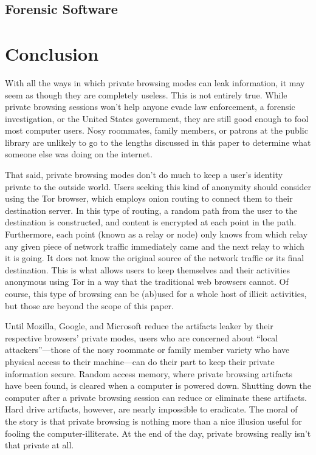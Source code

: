 \documentclass[pdftex,letterpaper,titlepage,12pt]{article}
\begin{document}
    \subsection{Forensic Software}
    

  \section{Conclusion}
  With all the ways in which private browsing modes can leak information, it
  may seem as though they are completely useless. This is not entirely true.
  While private browsing sessions won't help anyone evade law enforcement, a
  forensic investigation, or the United States government, they are still good
  enough to fool most computer users. Nosy roommates, family members, or
  patrons at the public library are unlikely to go to the lengths discussed in
  this paper to determine what someone else was doing on the internet.

  That said, private browsing modes don't do much to keep a user's identity
  private to the outside world. Users seeking this kind of anonymity should 
  consider using the Tor browser, which employs onion routing to connect them 
  to their destination server. In this type of routing, a random path from the 
  user to the destination is constructed, and content is encrypted at each 
  point in the path. Furthermore, each point (known as a relay or node) only 
  knows from which relay any given piece of network traffic immediately came 
  and the next relay to which it is going. It does not know the original source
  of the network traffic or its final destination. This is what allows users to
  keep themselves and their activities anonymous using Tor in a way that the 
  traditional web browsers cannot.\cite{tor13} Of course, this type of browsing
  can be (ab)used for a whole host of illicit activities, but those are beyond
  the scope of this paper.

  Until Mozilla, Google, and Microsoft reduce the artifacts leaker by their
  respective browsers' private modes, users who are concerned about ``local 
  attackers''---those of the nosy roommate or family member variety who have 
  physical access to their machine---can do their part to keep their private
  information secure. Random access memory, where private browsing artifacts
  have been found, is cleared when a computer is powered down. Shutting down
  the computer after a private browsing session can reduce or eliminate these
  artifacts. Hard drive artifacts, however, are nearly impossible to eradicate.
  The moral of the story is that private browsing is nothing more than a nice
  illusion useful for fooling the computer-illiterate. At the end of the day,
  private browsing really isn't that private at all.
\end{document}
